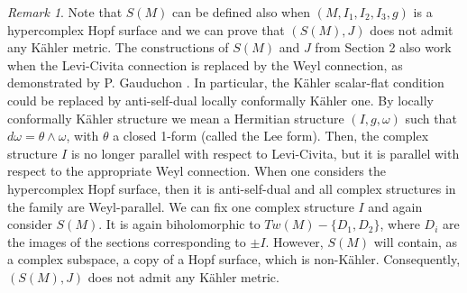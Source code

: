 \documentclass[11pt]{amsart}
\theoremstyle{definition}
\theoremstyle{plain}
\theoremstyle{definition}
\theoremstyle{plain}
\theoremstyle{remark}
\newtheorem{rmk}[Def]{Remark}
\theoremstyle{plain}
\begin{document}
\begin{rmk} 
Note that $S(M)$ can be defined also  when $(M, I_1, I_2, I_3, g)$ is a  hypercomplex Hopf surface and we can prove that $(S(M), J)$  does not admit any  K\"ahler metric. The constructions of $S(M)$ and $J$ from  Section  2  also work when the Levi-Civita connection is replaced by the Weyl connection,  as  demonstrated by P. Gauduchon \cite{Gauduchon}.   In particular,  the K\"ahler scalar-flat condition could be replaced by  anti-self-dual  locally conformally K\"ahler one. By locally conformally K\"ahler structure  we mean a Hermitian structure   $(I, g, \omega)$ such that $d \omega = \theta \wedge \omega$,  with  $\theta$ a closed 1-form (called the Lee form).  Then,  the complex structure  $I$  is no longer parallel with respect to Levi-Civita, but  it is parallel with respect to the appropriate Weyl connection. When one considers the hypercomplex Hopf surface, then it is anti-self-dual and all complex structures in the family are Weyl-parallel.  We can fix one complex structure $I$ and again consider $S(M)$. It is again biholomorphic to $Tw(M)-\{D_1,D_2\}$,  where $D_i$ are the images of the sections corresponding to $\pm I$. However,  $S(M)$ will contain, as a complex subspace, a copy of a Hopf surface, which is non-K\"ahler. Consequently, $(S(M), J)$ does not admit  any K\"ahler metric.  

\end{rmk}
\end{document}
